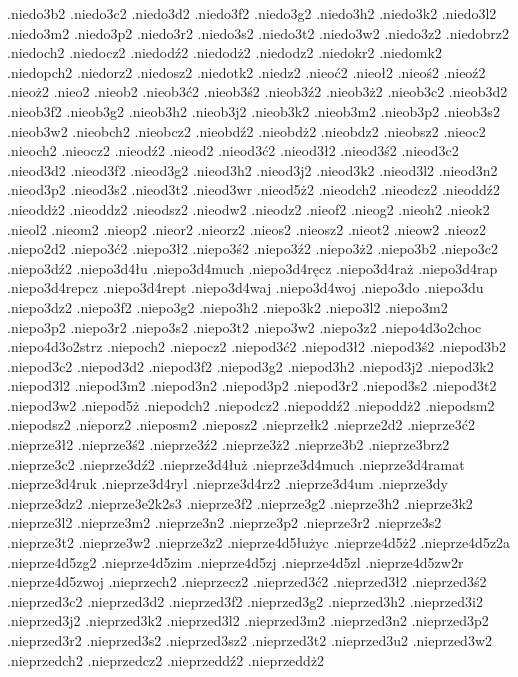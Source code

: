 {.niedo3b2
.niedo3c2
.niedo3d2
.niedo3f2
.niedo3g2
.niedo3h2
.niedo3k2
.niedo3l2
.niedo3m2
.niedo3p2
.niedo3r2
.niedo3s2
.niedo3t2
.niedo3w2
.niedo3z2
.niedobrz2
.niedoch2
.niedocz2
.niedodź2
.niedodż2
.niedodz2
.niedokr2
.niedomk2
.niedopch2
.niedorz2
.niedosz2
.niedotk2
.niedz2
.nieoć2
.nieoł2
.nieoś2
.nieoź2
.nieoż2
.nieo2
.nieob2
.nieob3ć2
.nieob3ś2
.nieob3ź2
.nieob3ż2
.nieob3c2
.nieob3d2
.nieob3f2
.nieob3g2
.nieob3h2
.nieob3j2
.nieob3k2
.nieob3m2
.nieob3p2
.nieob3s2
.nieob3w2
.nieobch2
.nieobcz2
.nieobdź2
.nieobdż2
.nieobdz2
.nieobsz2
.nieoc2
.nieoch2
.nieocz2
.nieodź2
.nieod2
.nieod3ć2
.nieod3ł2
.nieod3ś2
.nieod3c2
.nieod3d2
.nieod3f2
.nieod3g2
.nieod3h2
.nieod3j2
.nieod3k2
.nieod3l2
.nieod3n2
.nieod3p2
.nieod3s2
.nieod3t2
.nieod3wr
.nieod5ż2
.nieodch2
.nieodcz2
.nieoddź2
.nieoddż2
.nieoddz2
.nieodsz2
.nieodw2
.nieodz2
.nieof2
.nieog2
.nieoh2
.nieok2
.nieol2
.nieom2
.nieop2
.nieor2
.nieorz2
.nieos2
.nieosz2
.nieot2
.nieow2
.nieoz2
.niepo2d2
.niepo3ć2
.niepo3ł2
.niepo3ś2
.niepo3ź2
.niepo3ż2
.niepo3b2
.niepo3c2
.niepo3dź2
.niepo3d4łu
.niepo3d4much
.niepo3d4ręcz
.niepo3d4raż
.niepo3d4rap
.niepo3d4repcz
.niepo3d4rept
.niepo3d4waj
.niepo3d4woj
.niepo3do
.niepo3du
.niepo3dz2
.niepo3f2
.niepo3g2
.niepo3h2
.niepo3k2
.niepo3l2
.niepo3m2
.niepo3p2
.niepo3r2
.niepo3s2
.niepo3t2
.niepo3w2
.niepo3z2
.niepo4d3o2choc
.niepo4d3o2strz
.niepoch2
.niepocz2
.niepod3ć2
.niepod3ł2
.niepod3ś2
.niepod3b2
.niepod3c2
.niepod3d2
.niepod3f2
.niepod3g2
.niepod3h2
.niepod3j2
.niepod3k2
.niepod3l2
.niepod3m2
.niepod3n2
.niepod3p2
.niepod3r2
.niepod3s2
.niepod3t2
.niepod3w2
.niepod5ż
.niepodch2
.niepodcz2
.niepoddź2
.niepoddż2
.niepodsm2
.niepodsz2
.nieporz2
.nieposm2
.nieposz2
.nieprzełk2
.nieprze2d2
.nieprze3ć2
.nieprze3ł2
.nieprze3ś2
.nieprze3ź2
.nieprze3ż2
.nieprze3b2
.nieprze3brz2
.nieprze3c2
.nieprze3dź2
.nieprze3d4łuż
.nieprze3d4much
.nieprze3d4ramat
.nieprze3d4ruk
.nieprze3d4ryl
.nieprze3d4rz2
.nieprze3d4um
.nieprze3dy
.nieprze3dz2
.nieprze3e2k2s3
.nieprze3f2
.nieprze3g2
.nieprze3h2
.nieprze3k2
.nieprze3l2
.nieprze3m2
.nieprze3n2
.nieprze3p2
.nieprze3r2
.nieprze3s2
.nieprze3t2
.nieprze3w2
.nieprze3z2
.nieprze4d5łużyc
.nieprze4d5ż2
.nieprze4d5z2a
.nieprze4d5zg2
.nieprze4d5zim
.nieprze4d5zj
.nieprze4d5zl
.nieprze4d5zw2r
.nieprze4d5zwoj
.nieprzech2
.nieprzecz2
.nieprzed3ć2
.nieprzed3ł2
.nieprzed3ś2
.nieprzed3c2
.nieprzed3d2
.nieprzed3f2
.nieprzed3g2
.nieprzed3h2
.nieprzed3i2
.nieprzed3j2
.nieprzed3k2
.nieprzed3l2
.nieprzed3m2
.nieprzed3n2
.nieprzed3p2
.nieprzed3r2
.nieprzed3s2
.nieprzed3sz2
.nieprzed3t2
.nieprzed3u2
.nieprzed3w2
.nieprzedch2
.nieprzedcz2
.nieprzeddź2
.nieprzeddż2
}
